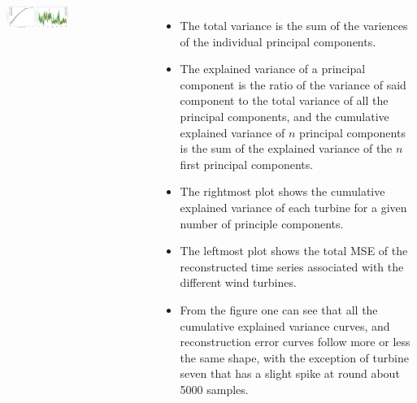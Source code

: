 \documentclass[18pt, a3paper, portrait]{tikzposter}
\begin{document}
\begin{columns}
    {
        \begin{tikzfigure}
            \includegraphics[width=0.45\textwidth]{images/two_besides.png}
        \end{tikzfigure}
    }
 
    {
        \begin{itemize}
            \item The total variance is the sum of the variences of the individual principal components.
            \item The explained variance of a principal component is the ratio of the variance of said component to the total variance of all the principal components, and the cumulative explained variance of $n$ principal components is the sum of the explained variance of the $n$ first principal components.
            \item The rightmost plot shows the cumulative explained variance of each turbine for a given number of principle components.
            \item The leftmost plot shows the total MSE of the reconstructed time series associated with the different wind turbines.
            \item From the figure one can see that all the cumulative explained variance curves, and reconstruction error curves follow more or less the same shape, with the exception of turbine seven that has a slight spike at round about 5000 samples. 
        \end{itemize}
    }
\end{columns}
\end{document}
